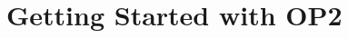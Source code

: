 

\appendixpage
\setcounter{section}{0}
\renewcommand{\thesection}{\Alph{section}}

\section{Getting Started with OP2}
\label{app:getStart}
